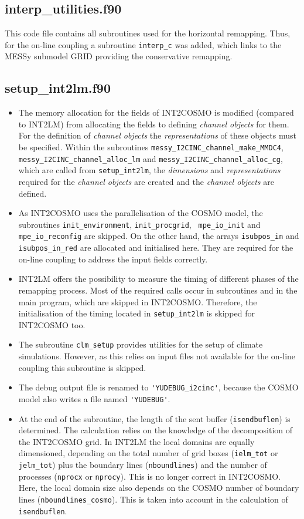 \documentclass[11pt,twoside]{article}
\begin{document}
\subsection{interp\_utilities.f90}
This code file contains all subroutines used for the horizontal remapping.
Thus, for the on-line coupling a subroutine \verb|interp_c| was added,
which links to the MESSy submodel GRID providing the conservative remapping.


\subsection{setup\_int2lm.f90}
\begin{itemize}
\item The memory allocation for the fields of INT2COSMO is modified (compared
to INT2LM) from allocating the fields to defining {\it channel objects}
 for them.
For the definition of {\it channel objects} the {\it representations} of these 
objects must be specified. 
Within the subroutines \verb|messy_I2CINC_channel_make_MMDC4|, 
\verb|messy_I2CINC_channel_alloc_lm|  and 
\verb|messy_I2CINC_channel_alloc_cg|, 
which are called 
from \verb|setup_int2lm|, the {\it dimensions} and {\it representations}
required for the {\it channel objects} are created and the {\it
channel objects} are defined. 

\item As INT2COSMO uses the parallelisation of the COSMO model, the subroutines
\verb|init_environment|, \verb|init_procgrid|, \verb| mpe_io_init| and
 \verb|mpe_io_reconfig| are skipped.
On the other hand, the arrays \verb|isubpos_in|
and \verb|isubpos_in_red| are allocated and initialised here. They are
required for the on-line coupling to address the input
fields correctly.
\item INT2LM offers the possibility to measure the timing of different phases of
the remapping process. Most of the required calls occur in subroutines
and in the main program, which are skipped in INT2COSMO. Therefore, the 
initialisation of the timing located in \verb|setup_int2lm| is skipped for 
INT2COSMO too.
\item The subroutine \verb|clm_setup| provides utilities for the
setup of climate simulations. However, as this relies on input files
not available for the on-line coupling this subroutine is skipped.
\item The debug output file is renamed to \verb|'YUDEBUG_i2cinc'|, because the 
COSMO model also writes a file named \verb|'YUDEBUG'|.
\item At the end of the subroutine, the length of the sent buffer 
(\verb|isendbuflen|) is determined.
The calculation relies on the knowledge of the decomposition of the INT2COSMO
grid. In INT2LM the local domains are equally dimensioned, depending
on the total number of grid boxes (\verb|ielm_tot| or \verb|jelm_tot|) plus the 
boundary lines (\verb|nboundlines|) and the number of processes (\verb|nprocx|
 or \verb|nprocy|). This is no longer correct in INT2COSMO.
Here, the local domain size also depends on  the COSMO number of boundary
lines (\verb|nboundlines_cosmo|). This is taken into account in the 
calculation of \verb|isendbuflen|.
\end{itemize}
\end{document}
